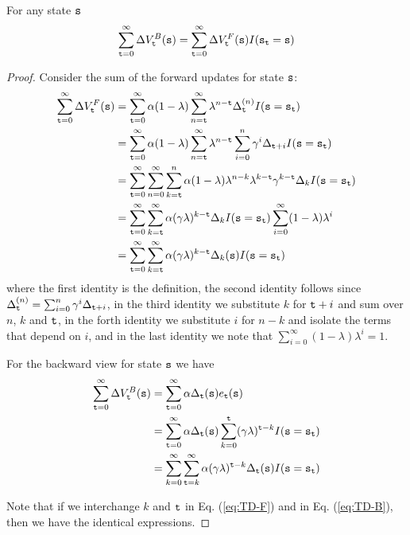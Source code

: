 \begin{theorem}
For any state ${\tt s}$
\[
\sum_{{\tt t}=0}^{\infty} \Delta V^B_{\tt t}
({\tt s})=\sum_{{\tt t}=0}^{\infty} \Delta V_{\tt t}^F({\tt s})
I({\tt s}_{\tt t}={\tt s})
\]
\end{theorem}

\begin{proof}
Consider the sum of the forward updates for state ${\tt s}$:
\begin{align}
\sum_{\ttime=0}^{\infty } \Delta V^F_\ttime (\state)&=
\sum_{\ttime=0}^{\infty} \alpha
(1-\lambda) \sum_{n=\ttime}^{\infty} \lambda^{n-\ttime}\Delta_\ttime^{(n)} I(\state=\state_\ttime)\nonumber\\
%
&= \sum_{\ttime=0}^{\infty}  \alpha
(1-\lambda) \sum_{n=\ttime}^{\infty} \lambda^{n-\ttime}\sum_{i=0}^n \discount^i \Delta_{\ttime+i} I(\state=\state_\ttime)\nonumber\\
%
&=\sum_{\ttime=0}^\infty \sum_{n=0}^\infty \sum_{k=\ttime}^n \alpha
(1-\lambda)
\lambda^{n-k}\lambda^{k-\ttime}\discount^{k-\ttime}\Delta_k I(\state=\state_\ttime)\nonumber\\
%
&=\sum_{\ttime=0}^\infty \sum_{k=\ttime}^\infty \alpha
(\discount\lambda)^{k-\ttime}\Delta_k I(\state=\state_\ttime) \sum_{i=0}^\infty (1-\lambda)\lambda^{i}\nonumber\\
%
&= \sum_{\ttime=0}^\infty \sum_{k=\ttime}^\infty \alpha
(\discount\lambda)^{k-\ttime} \Delta_k(\state)
I(\state=\state_\ttime) \label{eq:TD-F}
\end{align}
where the first identity is the definition, the second identity
follows since $\Delta_{\tt t}^{(n)}=\sum_{i=0}^n\gamma^i
\Delta_{{\tt t}+i}$, in the third identity we substitute $k$ for
${\tt t}+i$ and sum over $n$, $k$ and ${\tt t}$, in the forth identity we
substitute $i$ for $n-k$ and isolate the terms that depend on $i$,
and in the last identity we note that $\sum_{i=0}^\infty
(1-\lambda)\lambda^{i}=1$.

For the backward view for state ${\tt s}$ we have
\begin{align}
\sum_{{\tt t}=0}^{\infty } \Delta V^B_{\tt t} ({\tt s})&=\sum_{{\tt t}=0}^{\infty} \alpha
\Delta_{\tt t}({\tt s}) e_{{\tt t}}({\tt s})\\
&=\sum_{{\tt t}=0}^{\infty} \alpha
\Delta_{\tt t}({\tt s}) \sum_{k=0}^{\tt t} (\gamma\lambda)^{{\tt t}-k} I({\tt s}={\tt s}_{\tt t})\nonumber\\
&= \sum_{k=0}^\infty \sum_{{\tt t}=k}^\infty \alpha
(\gamma\lambda)^{{\tt t}-k}\Delta_{\tt t}({\tt s})I({\tt s}={\tt s}_{\tt t})
\label{eq:TD-B}
\end{align}

Note that if we interchange $k$ and ${\tt t}$ in Eq. (\ref{eq:TD-F})
and in Eq. (\ref{eq:TD-B}), then we have the identical expressions.
\end{proof}

